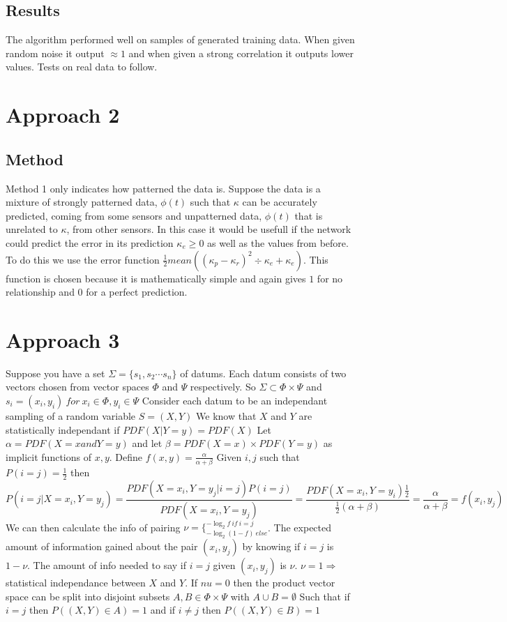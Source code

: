 \documentclass[12pt]{article}
\begin{document}
\subsection{Results}
The algorithm performed well on samples of generated training data. When given random noise it output $\approx1$ and when given a strong correlation it outputs lower values. Tests on real data to follow.
\section{Approach 2}
\subsection{Method}
Method 1 only indicates how patterned the data is. Suppose the data is a mixture of strongly patterned data, $\phi(t)$ such that $\kappa$ can be accurately predicted, coming from some sensors and unpatterned data, $\phi(t)$ that is unrelated to $\kappa$, from other sensors. In this case it would be usefull if the network could predict the error in its prediction $\kappa_e\geq 0$ as well as the values from before. To do this we use the error function $\frac12mean((\kappa_p-\kappa_r)^2\div \kappa_e+\kappa_e)$. This function is chosen because it is mathematically simple and again gives $1$ for no relationship and $0$ for a perfect prediction. 
\section{Approach 3}
Suppose you have a set $\Sigma=\lbrace s_1,s_2\cdots s_n \rbrace$ of datums. Each datum consists of two vectors chosen from vector spaces $\Phi$ and $\Psi$ respectively. So $\Sigma\subset\Phi\times\Psi$ and $s_i=(x_i,y_i) \ for\ x_i\in \Phi,y_i\in \Psi$ 
Consider each datum to be an independant sampling of a random variable $S=(X,Y)$
We know that $X$ and $Y$ are statistically independant if $PDF(X|Y=y)=PDF(X)$
Let $\alpha=PDF(X=x and Y=y)$ and let $\beta=PDF(X=x)\times PDF(Y=y)$ as implicit functions of $x,y$. 
Define $f(x,y)=\frac{\alpha}{\alpha+\beta}$
Given $i,j$ such that $P(i=j)=\frac12$ then $$P(i=j|X=x_i,Y=y_j)=\frac{PDF(X=x_i,Y=y_j|i=j)P(i=j)}{PDF(X=x_i,Y=y_j)}=\frac{PDF(X=x_i,Y=y_i)\frac12}{\frac12(\alpha+\beta)}=\frac{\alpha}{\alpha+\beta}=f(x_i,y_j)$$
We can then calculate the info of pairing $\nu=\lbrace^{-\log_2f\ if\ i=j}_{-\log_2(1-f)\ else}$. The expected amount of information gained about the pair $(x_i,y_j)$ by knowing if $i=j$ is $1-\nu$. The amount of info needed to say if $i=j$ given $(x_i,y_j)$ is $\nu$. $\nu=1\Rightarrow$statistical independance between $X$ and $Y$. If $nu=0$ then the product vector space can be split into disjoint subsets $A,B\in \Phi \times \Psi$ with $A\cup B=\emptyset$ Such that if $i=j$ then $P((X,Y)\in A)=1$ and if $i\neq j$ then $P((X,Y)\in B)=1$ 
\end{document}
